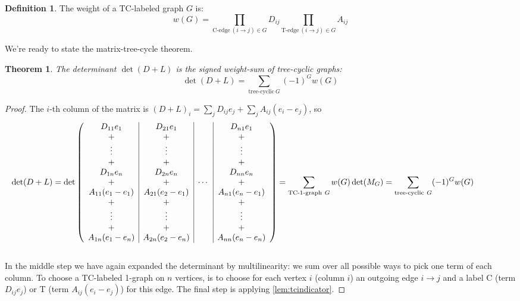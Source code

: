 \documentclass[a4paper, 11pt]{article}
\newtheorem{theorem}{Theorem}[section]
\theoremstyle{definition}
\newtheorem{definition}{Definition}[section]
\begin{document}
\begin{definition}
  The weight of a TC-labeled graph $G$ is:
  \[
    w(G) = \prod_{\text{C-edge}\ (i \to j) \in G} D_{ij} \prod_{\text{T-edge}\ (i \to j) \in G} A_{ij}
  \]
\end{definition}

We’re ready to state the matrix-tree-cycle theorem.

\begin{theorem} The determinant $\det(D+L)$ is the signed weight-sum of tree-cyclic graphs:
  \[
    \det(D + L) = \sum_{\text{tree-cyclic}\ G} (-1)^G w(G)
  \]
\end{theorem}
\begin{proof}
  The $i$-th column of the matrix is $(D + L)_i = \sum_j D_{ij} e_j + \sum_j A_{ij}(e_i - e_j)$, so \\
  \begin{align*}
    \hspace*{-1.5cm}
    \det(D + L) = \det \left(
    \begin{array}{c|c|c|c}
      D_{11} e_1         & D_{21} e_1         &        & D_{n1} e_1          \\
      +                  & +                  &        & +                   \\
      \vdots             & \vdots             &        & \vdots              \\
      +                  & +                  &        & +                   \\
      D_{1n} e_n         & D_{2n} e_n         &        & D_{nn} e_n          \\
      +                  & +                  & \cdots & +                   \\
      A_{11} (e_1 - e_1) & A_{21} (e_2 - e_1) &        & A_{n1} (e_n - e_1)  \\
      +                  & +                  &        & +                   \\
      \vdots             & \vdots             &        & \vdots              \\
      +                  & +                  &        & +                   \\
      A_{1n} (e_1 - e_n) & A_{2n} (e_2 - e_n) &        & A_{nn} (e_n - e_n)
    \end{array} \right)
    = \sum_{\text{TC-1-graph}\ G} w(G) \det(M_G)
    = \sum_{\text{tree-cyclic}\ G} (-1)^G w(G)
  \end{align*} \\
  In the middle step we have again expanded the determinant by multilinearity: we sum over all possible ways to pick one term of each column. To choose a TC-labeled 1-graph on $n$ vertices, is to choose for each vertex $i$ (column $i$) an outgoing edge $i \to j$ and a label C (term $D_{ij} e_j$) or T (term $A_{ij}(e_i - e_j)$) for this edge. The final step is applying \cref{lem:tcindicator}.
\end{proof}
\end{document}

